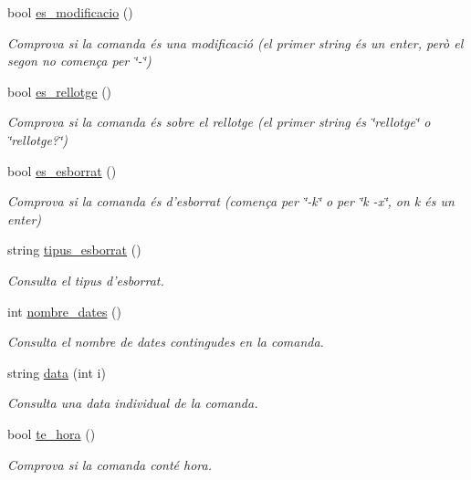 \begin{DoxyCompactItemize}
bool \hyperlink{class_comanda_a2a33a5497c7d156f22065656cb48d9a1}{es\-\_\-modificacio} ()
\begin{DoxyCompactList}\small\item\em Comprova si la comanda és una modificació (el primer string és un enter, però el segon no comença per \char`\"{}-\/\char`\"{}) \end{DoxyCompactList}\item 
bool \hyperlink{class_comanda_aa8767f298317c3bb07f90676cabb8c43}{es\-\_\-rellotge} ()
\begin{DoxyCompactList}\small\item\em Comprova si la comanda és sobre el rellotge (el primer string és \char`\"{}rellotge\char`\"{} o \char`\"{}rellotge?\char`\"{}) \end{DoxyCompactList}\item 
bool \hyperlink{class_comanda_a9e71320e8617ce224c8d994d0969555a}{es\-\_\-esborrat} ()
\begin{DoxyCompactList}\small\item\em Comprova si la comanda és d'esborrat (comença per \char`\"{}-\/k\char`\"{} o per \char`\"{}k -\/x\char`\"{}, on k és un enter) \end{DoxyCompactList}\item 
string \hyperlink{class_comanda_a998dc172668a108837512f818ca5430f}{tipus\-\_\-esborrat} ()
\begin{DoxyCompactList}\small\item\em Consulta el tipus d'esborrat. \end{DoxyCompactList}\item 
int \hyperlink{class_comanda_aadabfc85ec7cdeb45039e8952a1ab124}{nombre\-\_\-dates} ()
\begin{DoxyCompactList}\small\item\em Consulta el nombre de dates contingudes en la comanda. \end{DoxyCompactList}\item 
string \hyperlink{class_comanda_ab4ce0a50bde32145d11cbaee753526c7}{data} (int i)
\begin{DoxyCompactList}\small\item\em Consulta una data individual de la comanda. \end{DoxyCompactList}\item 
bool \hyperlink{class_comanda_abf8b926146f3664aacfd24d7800014e5}{te\-\_\-hora} ()
\begin{DoxyCompactList}\small\item\em Comprova si la comanda conté hora. \end{DoxyCompactList}\item 

\end{DoxyCompactItemize}
